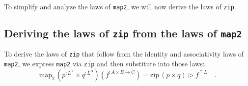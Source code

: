 To simplify and analyze the laws of \lstinline!map2!, we will now
derive the laws of \lstinline!zip!.

\subsection{Deriving the laws of \texttt{zip} from the laws of \texttt{map2}\label{subsec:Deriving-the-laws-of-zip}}

To derive the laws of \lstinline!zip! that follow from the identity
and associativity laws of \lstinline!map2!, we express \lstinline!map2!
via \lstinline!zip! and then substitute into those laws:
\begin{equation}
\text{map}_{2}\,(p^{:L^{A}}\times q^{:L^{B}})(f^{:A\times B\rightarrow C})=\text{zip}\,(p\times q)\triangleright f^{\uparrow L}\quad.\label{eq:express-map2-via-zip}
\end{equation}

